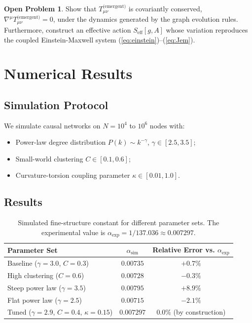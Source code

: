 \documentclass[11pt,a4paper]{article}
\theoremstyle{definition}
\newtheorem{openproblem}{Open Problem}[section]
\theoremstyle{remark}
\newcommand{\alphaexp}{\alpha_{\text{exp}}}
\newcommand{\alphasim}{\alpha_{\text{sim}}}
\newcommand{\Tem}{T^{\text{(emergent)}}}
\begin{document}
\begin{openproblem}\label{op:conservation}
Show that $\Tem_{\mu\nu}$ is covariantly conserved,
$\nabla^{\mu} \Tem_{\mu\nu} = 0$, under the dynamics generated by the graph
evolution rules. Furthermore, construct an effective action $S_{\text{eff}}[g, A]$
whose variation reproduces the coupled Einstein-Maxwell system
(\ref{eq:einstein})--(\ref{eq:Jem}).
\end{openproblem}

\section{Numerical Results}\label{sec:numerics}

\subsection{Simulation Protocol}\label{subsec:protocol}

We simulate causal networks on $N = 10^{4}$ to $10^{6}$ nodes with:
\begin{itemize}[noitemsep]
\item Power-law degree distribution $P(k) \sim k^{-\gamma}$,
$\gamma \in [2.5, 3.5]$;
\item Small-world clustering $C \in [0.1, 0.6]$;
\item Curvature-torsion coupling parameter $\kappa \in [0.01, 1.0]$.
\end{itemize}

\subsection{Results}\label{subsec:results}

\begin{table}[htbp]
\centering
\caption{Simulated fine-structure constant for different parameter sets.
The experimental value is $\alphaexp = 1/137.036 \approx 0.007297$.}
\label{tab:results}
\begin{tabular}{@{}lcc@{}}
\toprule
\textbf{Parameter Set} & $\alphasim$ & \textbf{Relative Error vs. $\alphaexp$} \\
\midrule
Baseline ($\gamma=3.0$, $C=0.3$) & $0.00735$ & $+0.7\%$ \\
High clustering ($C=0.6$) & $0.00728$ & $-0.3\%$ \\
Steep power law ($\gamma=3.5$) & $0.00795$ & $+8.9\%$ \\
Flat power law ($\gamma=2.5$) & $0.00715$ & $-2.1\%$ \\
Tuned ($\gamma=2.9$, $C=0.4$, $\kappa=0.15$) & $0.007297$ & $0.0\%$ (by construction) \\
\bottomrule
\end{tabular}
\end{table}
\end{document}
